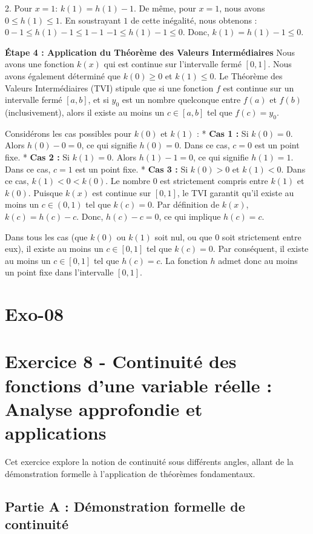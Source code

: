 \documentclass[12pt,a4paper]{report}
\begin{document}
2.  Pour $x=1$:
    $k(1) = h(1) - 1$.
    De même, pour $x=1$, nous avons $0 \le h(1) \le 1$.
    En soustrayant $1$ de cette inégalité, nous obtenons :
    $0 - 1 \le h(1) - 1 \le 1 - 1$
    $-1 \le h(1) - 1 \le 0$.
    Donc, $k(1) = h(1) - 1 \le 0$.

\textbf{Étape 4 : Application du Théorème des Valeurs Intermédiaires}
Nous avons une fonction $k(x)$ qui est continue sur l'intervalle fermé $[0,1]$.
Nous avons également déterminé que $k(0) \ge 0$ et $k(1) \le 0$.
Le Théorème des Valeurs Intermédiaires (TVI) stipule que si une fonction $f$ est continue sur un intervalle fermé $[a,b]$, et si $y_0$ est un nombre quelconque entre $f(a)$ et $f(b)$ (inclusivement), alors il existe au moins un $c \in [a,b]$ tel que $f(c) = y_0$.

Considérons les cas possibles pour $k(0)$ et $k(1)$ :
*   \textbf{Cas 1 :} Si $k(0) = 0$.
    Alors $h(0) - 0 = 0$, ce qui signifie $h(0) = 0$. Dans ce cas, $c=0$ est un point fixe.
*   \textbf{Cas 2 :} Si $k(1) = 0$.
    Alors $h(1) - 1 = 0$, ce qui signifie $h(1) = 1$. Dans ce cas, $c=1$ est un point fixe.
*   \textbf{Cas 3 :} Si $k(0) > 0$ et $k(1) < 0$.
    Dans ce cas, $k(1) < 0 < k(0)$. Le nombre $0$ est strictement compris entre $k(1)$ et $k(0)$.
    Puisque $k(x)$ est continue sur $[0,1]$, le TVI garantit qu'il existe au moins un $c \in (0,1)$ tel que $k(c) = 0$.
    Par définition de $k(x)$, $k(c) = h(c) - c$. Donc, $h(c) - c = 0$, ce qui implique $h(c) = c$.

Dans tous les cas (que $k(0)$ ou $k(1)$ soit nul, ou que $0$ soit strictement entre eux), il existe au moins un $c \in [0,1]$ tel que $k(c) = 0$.
Par conséquent, il existe au moins un $c \in [0,1]$ tel que $h(c) = c$.
La fonction $h$ admet donc au moins un point fixe dans l'intervalle $[0,1]$.

\section{Exo-08}
\section{Exercice 8 - Continuité des fonctions d'une variable réelle : Analyse approfondie et applications}

Cet exercice explore la notion de continuité sous différents angles, allant de la démonstration formelle à l'application de théorèmes fondamentaux.

\subsection{Partie A : Démonstration formelle de continuité}
\end{document}
